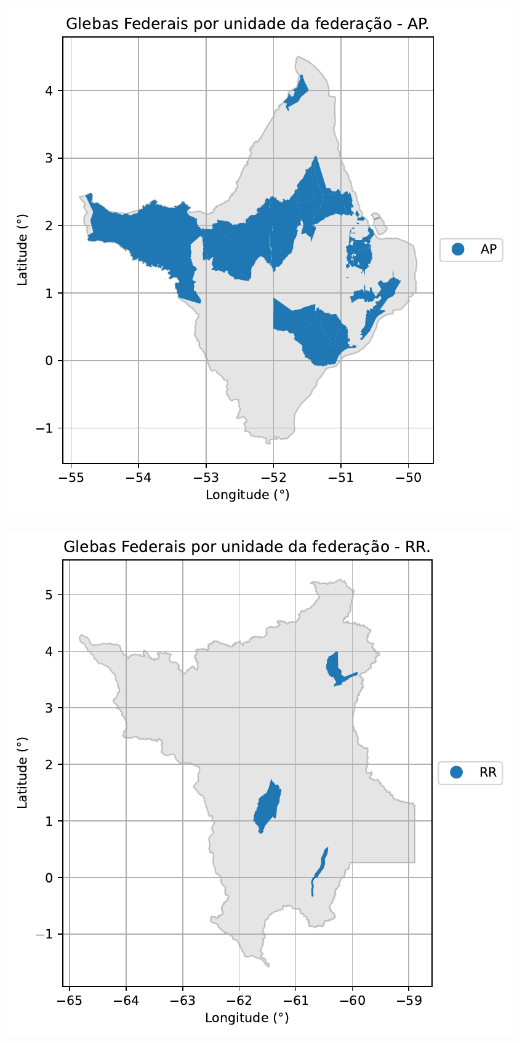\documentclass[
  letterpaper,
]{report}
\begin{document}
\includegraphics{./5-delimitacao_files/figure-pdf/cell-6-output-8.pdf}

\includegraphics{./5-delimitacao_files/figure-pdf/cell-6-output-9.pdf}
\end{document}
